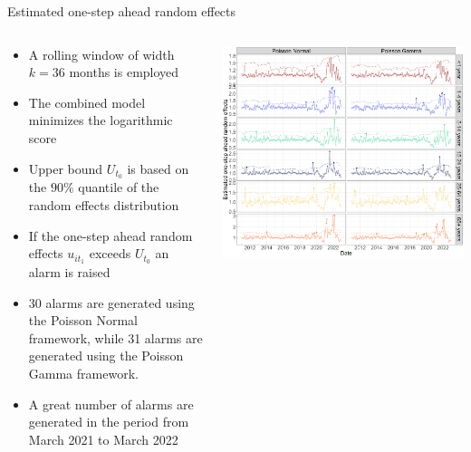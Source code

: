 \documentclass[aspectratio=169]{beamer}
\begin{document}
\begin{frame}{Estimated one-step ahead random effects}
\begin{columns}
\begin{column}{.50\textwidth}
\begin{itemize}
  \item<1> A rolling window of width $k=36$ months is employed
  \item<1> The combined model minimizes the logarithmic score  
  \item<1> Upper bound $U_{t_0}$ is based on the $90\%$ quantile of the random effects distribution
  \item<1> If the one-step ahead random effects $u_{it_1}$ exceeds $U_{t_0}$ an alarm is raised
\end{itemize}
\vspace{.1cm}
\begin{itemize}
  \item<2> 30 alarms are generated using the Poisson Normal framework, while 31 alarms are generated using the Poisson Gamma framework.
  \item<2> A great number of alarms are generated in the period from March 2021 to March 2022
\end{itemize}
\end{column}
\hfill
\begin{column}{.46\textwidth}

 \tiny


\includegraphics[width=1\linewidth]{../figures/Compare_novel_STEC} 

 \normalsize
\end{column}
\end{columns}
\end{frame}
\end{document}
